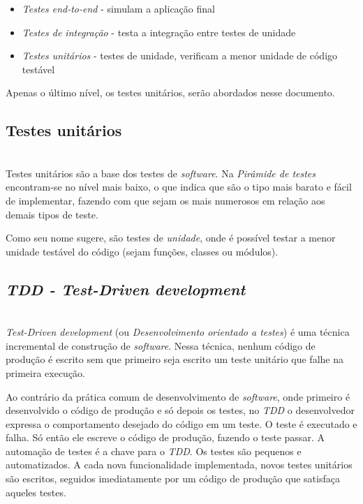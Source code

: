 \documentclass[times, twoside, watermark]{artigo}
\begin{document}
\begin{itemize}
\itemsep0em 
  \item \textit{Testes end-to-end} - simulam a aplicação final
  \item \textit{Testes de integração} - testa a integração entre testes de unidade
  \item \textit{Testes unitários} - testes de unidade, verificam a menor unidade de
        código testável
\end{itemize}

Apenas o último nível, os testes unitários, serão abordados nesse documento.

\subsection{Testes unitários}\hfill\\

Testes unitários são a base dos testes de \textit{software}. Na \textit{Pirâmide de
  testes} encontram-se no nível mais baixo, o que indica que são
o tipo mais barato e fácil de implementar\cite{contan2018test},
fazendo com que sejam os mais numerosos em relação aos demais tipos de teste.

Como seu nome sugere, são testes de \textit{unidade}, onde é possível testar a
menor unidade testável do código (sejam funções, classes ou módulos).

\subsection{\textit{TDD - Test-Driven development}}\hfill\\

\textit{Test-Driven development} (ou \textit{Desenvolvimento orientado a testes}) é
uma técnica incremental de construção de \textit{software}.
Nessa técnica, nenhum código de produção é escrito sem que primeiro seja escrito um
teste unitário que falhe na primeira execução.

Ao contrário da prática comum de desenvolvimento de \textit{software}, onde primeiro
é desenvolvido o código de produção e só depois os testes, no \textit{TDD}
o desenvolvedor expressa o comportamento desejado do código em um teste.
O teste é executado e falha. Só então ele escreve o código de produção, fazendo o
teste passar.
A automação de testes é a chave para o \textit{TDD}. Os testes são pequenos e
automatizados.
A cada nova funcionalidade implementada, novos testes unitários são escritos,
seguidos imediatamente por um código de produção que satisfaça aqueles testes.
\end{document}

